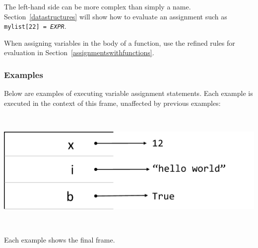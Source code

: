 \documentclass{article}
\newcommand{\expr}[1]{\texttt{#1}}
\newcommand{\mvar}[1]{\expr{\emph{\uppercase{#1}}}}
\newcommand{\pretabularspace}{\ifhevea\else \strut \\ \strut \fi}
\newcommand{\posttabularspace}{\ifhevea\else \strut \\ \strut \fi}
\begin{document}
The left-hand side can be more complex than simply a name.
Section~\ref{datastructures} will show how to evaluate an assignment such
as \expr{mylist[22] = \mvar{EXPR}}.

  When assigning variables in the body of a function, use the refined rules for evaluation in Section~\ref{assignmentswithfunctions}.

\subsubsection{Examples}

Below are examples of executing variable assignment statements.
Each example is executed in the context of this frame, unaffected by previous examples:

  \pretabularspace
  \includegraphics{diagrams/bindings-1.png}
  \posttabularspace

Each example shows the final frame.
\end{document}
